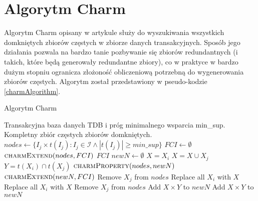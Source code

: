 \section{Algorytm Charm}

Algorytm Charm opisany w artykule \cite{charmArt} służy do wyszukiwania wszystkich domkniętych zbiorów częstych w zbiorze danych transakcyjnych. Sposób jego działania pozwala na bardzo tanie pozbywanie się zbiorów redundantnych (i takich, które będą generowały redundantne zbiory), co w praktyce w bardzo dużym stopniu ogranicza złożoność obliczeniową potrzebną do wygenerowania zbiorów częstych. Algorytm został przedstawiony w pseudo-kodzie \ref{charmAlgorithm}.

\begin{algorithm}
\caption{Algorytm Charm}
\label{charmAlgorithm}
\renewcommand{\algorithmicrequire}{\textbf{Wejście:}}
\renewcommand{\algorithmicensure}{\textbf{Wyjście:}}
\begin{algorithmic}
	\Require Transakcyjna baza danych TDB i próg minimalnego wsparcia min\_sup.
	\Ensure  Kompletny zbiór częstych zbiorów domkniętych.
		\State $nodes \gets \{I_{j} \times t(I_{j}) : I_{j} \in \mathcal{I} \wedge |t(I_{j})| \ge min\_sup \} $
		\State $FCI \gets \emptyset$ 
		\State $\Call{charmExtend}{nodes, FCI}$
		\State \Return $FCI$
	\EndFunction
			\State $newN \gets \emptyset$
			\State $X = X_{i}$
			 
				\State $X = X \cup X_{j}$
				\State $Y = t(X_{i}) \cap t(X_{j})$
				\State $\Call{charmProperty}{nodes, newN}$
			\EndFor
				\State $\Call{charmExtend}{newN, FCI}$
			\EndIf
		\EndFor
	\EndFunction
				\State Remove $X_{j}$ from $nodes$
				\State Replace all $X_{i}$ with $X$
				\State Replace all $X_{i}$ with $X$
				\State Remove $X_{j}$ from $nodes$
				\State Add $X \times Y$ to $newN$
				\State Add $X \times Y$ to $newN$
			\EndIf
		\EndIf
	\EndFunction
\end{algorithmic}
\end{algorithm}

